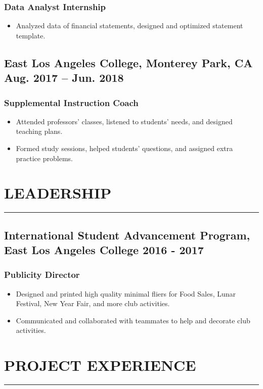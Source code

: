 \documentclass{article}
\newcommand{\divider}{\vskip2pt\hrule\vskip2pt}
\begin{document}
		\subsubsection*{Data Analyst Internship}
		\begin{itemize}
			\item Analyzed data of financial statements, designed and optimized statement template.
		\end{itemize}
	
		\subsection*{East Los Angeles College{\normalfont, Monterey Park, CA \hfill Aug. 2017 – Jun. 2018}}
		\subsubsection*{Supplemental Instruction Coach}
		\begin{itemize}
			\setlength\itemsep{-1pt}
			\item Attended professors' classes, listened to students' needs, and designed teaching plans.
			\item Formed study sessions, helped students' questions, and assigned extra practice problems.
		\end{itemize}
	
	\section*{LEADERSHIP}
	\divider
		\subsection*{International Student Advancement Program{\normalfont, East Los Angeles College \hfill 2016 - 2017}}
		\subsubsection*{Publicity Director}
		\begin{itemize}
			\setlength\itemsep{-1pt}
			\item Designed and printed high quality minimal fliers for Food Sales, Lunar Festival, New Year Fair, and more club activities.
			\item Communicated and collaborated with teammates to help and decorate club activities.
		\end{itemize}
	
	\section*{PROJECT EXPERIENCE}
	\divider
	
\end{document}
